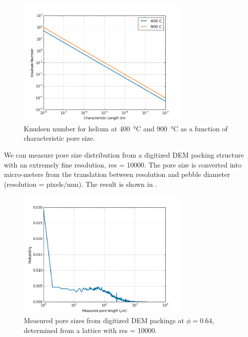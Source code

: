 \begin{figure}[ht]
    \centering
    \includegraphics[width=0.75\textwidth]{figures/lbm/Knudsen_limits}
    \caption{Knudsen number for helium at \SI{400}{\celsius} and \SI{900}{\celsius} as a function of characteristic pore size.}\label{fig:Knudsen_limits}
\end{figure}

We can measure pore size distribution from a digitized DEM packing structure with an extremely fine resolution, res = \num{10000}. The pore size is converted into micro-meters from the translation between resolution and pebble diameter (resolution = pixels/mm). The result is shown in .

\begin{figure}[ht]
    \centering
    \includegraphics[width=0.75\textwidth]{figures/lbm/res10000-pore-size-distributions}
    \caption{Measured pore sizes from digitized DEM packings at $\phi = 0.64$, determined from a lattice with res = \num{10000}.}\label{fig:res10000-pore-size-distributions}
\end{figure}

